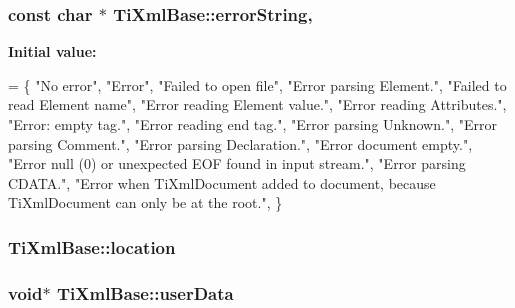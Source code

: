 \subsubsection[{\texorpdfstring{error\+String}{errorString}}]{\setlength{\rightskip}{0pt plus 5cm}const char $\ast$ Ti\+Xml\+Base\+::error\+String\hspace{0.3cm}{\ttfamily [static]}, {\ttfamily [protected]}}\hypertarget{class_ti_xml_base_a7ac8feec4100e446b3d78e1ac0659700}{}\label{class_ti_xml_base_a7ac8feec4100e446b3d78e1ac0659700}
{\bfseries Initial value\+:}
\begin{DoxyCode}
=
\{
    \textcolor{stringliteral}{"No error"},
    \textcolor{stringliteral}{"Error"},
    \textcolor{stringliteral}{"Failed to open file"},
    \textcolor{stringliteral}{"Error parsing Element."},
    \textcolor{stringliteral}{"Failed to read Element name"},
    \textcolor{stringliteral}{"Error reading Element value."},
    \textcolor{stringliteral}{"Error reading Attributes."},
    \textcolor{stringliteral}{"Error: empty tag."},
    \textcolor{stringliteral}{"Error reading end tag."},
    \textcolor{stringliteral}{"Error parsing Unknown."},
    \textcolor{stringliteral}{"Error parsing Comment."},
    \textcolor{stringliteral}{"Error parsing Declaration."},
    \textcolor{stringliteral}{"Error document empty."},
    \textcolor{stringliteral}{"Error null (0) or unexpected EOF found in input stream."},
    \textcolor{stringliteral}{"Error parsing CDATA."},
    \textcolor{stringliteral}{"Error when TiXmlDocument added to document, because TiXmlDocument can only be at the root."},
\}
\end{DoxyCode}
\subsubsection[{\texorpdfstring{location}{location}}]{ Ti\+Xml\+Base\+::location\hspace{0.3cm}{\ttfamily [protected]}}\hypertarget{class_ti_xml_base_a0d992580f3bc264909f898e942677a3c}{}\label{class_ti_xml_base_a0d992580f3bc264909f898e942677a3c}
\subsubsection[{\texorpdfstring{user\+Data}{userData}}]{\setlength{\rightskip}{0pt plus 5cm}void$\ast$ Ti\+Xml\+Base\+::user\+Data\hspace{0.3cm}{\ttfamily [protected]}}\hypertarget{class_ti_xml_base_ab242c01590191f644569fa89a080d97c}{}\label{class_ti_xml_base_ab242c01590191f644569fa89a080d97c}


